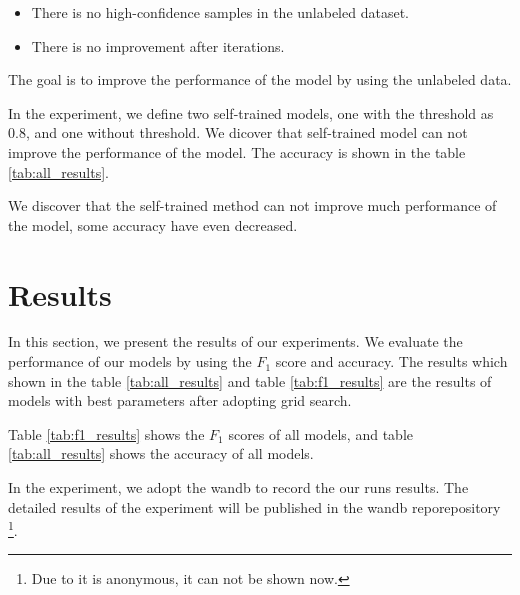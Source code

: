 \documentclass[11pt]{article}
\begin{document}
\begin{itemize}
    \item There is no high-confidence samples in the unlabeled dataset.
    \item There is no improvement after iterations. 
\end{itemize}

The goal is to improve the performance of the model by using the unlabeled data.

In the experiment, we define two self-trained models, one with the threshold as 0.8, and one without threshold.
We dicover that self-trained model can not improve the performance of the model.
The accuracy is shown in the table \ref{tab:all_results}.

We discover that the self-trained method can not improve much performance of the model, 
some accuracy have even decreased.


\section{Results}

In this section, we present the results of our experiments.
We evaluate the performance of our models by using the $F_1$ score and accuracy.
The results which shown in the table \ref{tab:all_results} and table \ref{tab:f1_results} are the results of models with best parameters after adopting grid search.

Table \ref{tab:f1_results} shows the $F_1$ scores of all models,
and table \ref{tab:all_results} shows the accuracy of all models.

In the experiment, we adopt the wandb to record the our runs results.
The detailed results of the experiment will be published in the wandb reporepository \footnote{Due to it is anonymous, it can not be shown now.}.
\end{document}
